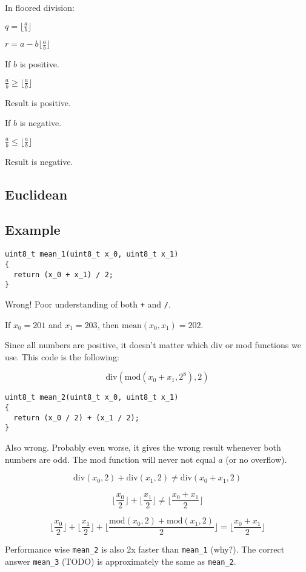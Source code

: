 In floored division:

$q = \lfloor \frac{a}{b} \rfloor$

$r = a - b \lfloor \frac{a}{b} \rfloor$

If $b$ is positive.

$\frac{a}{b} \geq \lfloor \frac{a}{b} \rfloor$

Result is positive.

If $b$ is negative.

$\frac{a}{b} \leq \lfloor \frac{a}{b} \rfloor$

Result is negative.

\subsection{Euclidean}

\subsection{Example}

\begin{lstlisting}
uint8_t mean_1(uint8_t x_0, uint8_t x_1)
{
  return (x_0 + x_1) / 2;
}
\end{lstlisting}

Wrong! Poor understanding of both \texttt{+} and \texttt{/}.

If $x_0 = 201$ and $x_1 = 203$, then $\text{mean}(x_0, x_1) = 202$.

Since all numbers are positive, it doesn't matter which div or mod functions we
use.
This code is the following:

\begin{equation*}
  \text{div}(\text{mod}(x_0 + x_1, 2^{8}), 2)
\end{equation*}

\begin{lstlisting}
uint8_t mean_2(uint8_t x_0, uint8_t x_1)
{
  return (x_0 / 2) + (x_1 / 2);
}
\end{lstlisting}

Also wrong. Probably even worse, it gives the wrong result whenever both numbers
are odd. The mod function will never not equal $a$ (or no overflow).

\begin{equation*}
  \text{div}(x_0 , 2) + \text{div}(x_1 , 2) \neq \text{div}(x_0 + x_1, 2)
\end{equation*}

\begin{equation*}
  \lfloor \frac{x_0}{2} \rfloor + \lfloor \frac{x_1}{2} \rfloor
  \neq \lfloor \frac{x_0 + x_1}{2} \rfloor
\end{equation*}

\begin{equation*}
  \lfloor \frac{x_0}{2} \rfloor + \lfloor \frac{x_1}{2} \rfloor
  + \lfloor \frac{\text{mod}(x_0, 2) + \text{mod}(x_1, 2)}{2} \rfloor
  = \lfloor \frac{x_0 + x_1}{2} \rfloor
\end{equation*}

Performance wise \texttt{mean\_2} is also 2x faster than \texttt{mean\_1}
(why?). The correct answer \texttt{mean\_3} (TODO) is approximately the same as
\texttt{mean\_2}.
